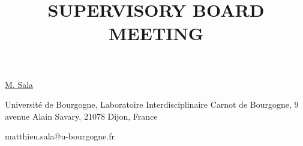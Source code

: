 \title{SUPERVISORY BOARD MEETING}

\underline{M. Sala}  

{\normalsize{\vspace{-4mm}
Université de Bourgogne,
Laboratoire Interdisciplinaire Carnot de Bourgogne,
9 avenue Alain Savary, 
21078 Dijon, France




\email matthieu.sala@u-bourgogne.fr}}


\vspace{\baselineskip}